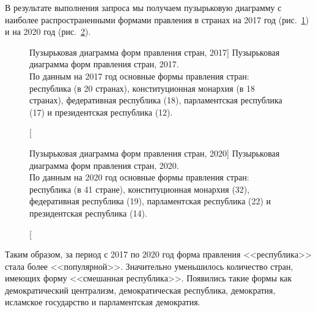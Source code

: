 
В результате выполнения запроса мы получаем пузырьковую диаграмму с наиболее распространенными формами правления в странах на 2017 год (рис.~\ref{fig:bubble_chart_forms_of_government_countries_2017}) и на 2020 год (рис.~\ref{fig:bubble_chart_forms_of_government_countries_2020}).

\begin{figure}
	{
		\setlength{\fboxsep}{0pt}%
		\setlength{\fboxrule}{1pt}%
	}
	\caption
	[Пузырьковая диаграмма форм правления стран, 2017]
	{Пузырьковая диаграмма форм правления стран, 2017.
		\\			
		По данным на 2017 год основные формы правления стран: республика (в 20 странах), конституционная монархия (в 18 странах), федеративная республика (18), парламентская республика (17) и президентская республика (12).}%
	\label{fig:bubble_chart_forms_of_government_countries_2017}%
\end{figure}

\begin{figure}
	{
		\setlength{\fboxsep}{0pt}%
		\setlength{\fboxrule}{1pt}%
	}
	\caption
	[Пузырьковая диаграмма форм правления стран, 2020]
	{Пузырьковая диаграмма форм правления стран, 2020.
	\\
	По данным на 2020 год  основные формы правления стран: республика (в 41 стране), конституционная монархия (32), федеративная республика (19), парламентская республика (22) и президентская республика (14).
}%
	\label{fig:bubble_chart_forms_of_government_countries_2020}%
\end{figure}

Таким образом, за период с 2017 по 2020 год форма правления <<республика>> стала более <<популярной>>. Значительно уменьшилось количество стран, имеющих форму  <<смешанная республика>>. Появились такие формы как демократический централизм, демократическая республика, демократия, исламское государство и парламентская демократия.

